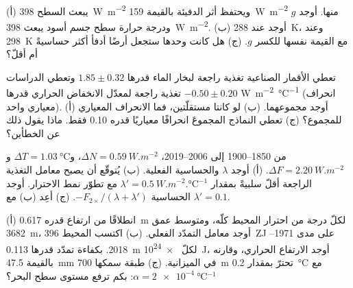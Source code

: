 \begin{exercise}[$\star\star$]\label{exo:b2:anthropogenic-climate-change:5}
(أ) يبعث السطح \qty{398}{W.m^{-2}} ويحتفظ أثر الدفيئة بالقيمة \qty{159}{W.m^{-2}} منها.
أوجد $g$ ودرجة حرارة سطح جسم أسود يبعث \qty{398}{W.m^{-2}}. (ب) أوجد
 عند \qty{288}{K}، وعند \qty{298}{K} مع القيمة نفسها للكسر $g$. (ج) هل كانت 
وحدها ستجعل أرضًا أدفأ أكثر حساسيةً أم أقلّ؟
\end{exercise}

\begin{exercise}[$\star\star$]\label{exo:b2:anthropogenic-climate-change:6}
تعطي الأقمار الصناعية تغذية راجعة لبخار الماء قدرها $1.85 \pm 0.32$ وتعطي الدراسات تغذية راجعة لمعدّل الانخفاض الحراري قدرها
$-0.50 \pm 0.20$ \unit{W.m^{-2}.\celsius^{-1}} (انحراف معياري واحد). (أ) أوجد مجموعهما.
(ب) لو كانتا مستقلّتين، فما الانحراف المعياري للمجموع؟ (ج) تعطي النماذج
المجموعَ انحرافًا معياريًا قدره \num{0.10} فقط. ماذا يقول ذلك عن الخطأين؟
\end{exercise}

\begin{exercise}[$\star\star$]\label{exo:b2:anthropogenic-climate-change:7}
من 1850--1900 إلى 2006--2019، $\Delta N = \qty{0.59}{W.m^{-2}}$، و$\Delta T = \qty{1.03}{\celsius}$
و$\Delta F = \qty{2.20}{W.m^{-2}}$. (أ) أوجد $\lambda$ والحساسية الفعلية. (ب) يُتوقّع أن يصبح
معامل التغذية الراجعة أقلّ سلبيةً بمقدار $\lambda' = \qty{0.5}{W.m^{-2}.\celsius^{-1}}$
مع تطوّر نمط الاحترار. أوجد الحساسية $-F_{2\times}/(\lambda + \lambda')$.
(ج) أعِد (ب) مع $\lambda' = 0.1$.
\end{exercise}

\begin{exercise}[$\star\star$]\label{exo:b2:anthropogenic-climate-change:8}
(أ) انطلاقًا من ارتفاع قدره \qty{0.617}{m} لكلّ درجة من احترار المحيط كلّه، ومتوسط عمق
\qty{3682}{m}، أوجد معامل التمدّد الفعلي. (ب) اكتسب المحيط \qty{396}{ZJ} على مدى
1971--2018. بكفاءة تمدّد قدرها \qty{0.113}{m} لكلّ \qty{e24}{J}، أوجد الارتفاع
الحراري، وقارنه بالقيمة \qty{47.5}{mm} في الميزانية. (ج) طبقة سمكها \qty{700}{m} تحترّ بمقدار
\qty{0.2}{\celsius} مع $\alpha = \qty{2e-4}{\celsius^{-1}}$: بكم ترفع مستوى سطح البحر؟
\end{exercise}

